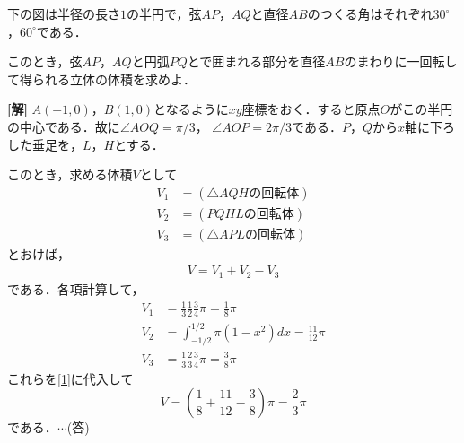 \documentclass[a4j]{jarticle}
\begin{document}

     \begin{oframed}
     下の図は半径の長さ$1$の半円で，弦$AP$，$AQ$と直径$AB$のつくる角はそれぞれ$30^\circ$，$60^\circ$である．
     
     このとき，弦$AP$，$AQ$と円弧$PQ$とで囲まれる部分を直径$AB$のまわりに一回転して得られる立体の体積を求めよ． 
          \begin{center}
          \scalebox{1}{}
          \end{center}
     \end{oframed}

\setlength{\columnseprule}{0.4pt}
\begin{multicols}{2}
{\bf[解]} $A(-1,0)$，$B(1,0)$となるように$xy$座標をおく．すると原点$O$がこの半円の中心である．故に$\angle AOQ=\pi/3$，
$\angle AOP=2\pi/3$である．$P$，$Q$から$x$軸に下ろした垂足を，$L$，$H$とする．
     \begin{center}
     \scalebox{1}{}
     \end{center}
このとき，求める体積$V$として
     \begin{align*}
     V_1&=(\triangle AQH\text{の回転体}) \\
     V_2&=(PQHL\text{の回転体}) \\
     V_3&=(\triangle APL\text{の回転体})
     \end{align*}
とおけば，
     \begin{align}
     V=V_1+V_2-V_3\label{1}
     \end{align}
である．各項計算して，
     \begin{align*}
     V_1&=\frac{1}{3}\frac{1}{2}\frac{3}{4}\pi=\frac{1}{8}\pi \\
     V_2&=\int_{-1/2}^{1/2}\pi(1-x^2)dx=\frac{11}{12}\pi \\
     V_3&=\frac{1}{3}\frac{2}{3}\frac{3}{4}\pi=\frac{3}{8}\pi
     \end{align*}
これらを\eqref{1}に代入して
     \[V=\left(\frac{1}{8}+\frac{11}{12}-\frac{3}{8}\right)\pi=\frac{2}{3}\pi\]
である．$\cdots$(答)
     
\newpage
\end{multicols}
\end{document}
